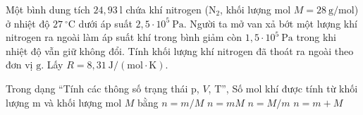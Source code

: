 \begin{ex}
Một bình dung tích $24,93\ \mathrm{l}$ chứa khí nitrogen ($\mathrm{N_2}$, khối lượng mol $M = 28\ \mathrm{g/mol}$) ở nhiệt độ $27\ ^\circ\mathrm{C}$ dưới áp suất $2,5 \cdot 10^5\ \mathrm{Pa}$. Người ta mở van xả bớt một lượng khí nitrogen ra ngoài làm áp suất khí trong bình giảm còn $1,5 \cdot 10^5\ \mathrm{Pa}$ trong khi nhiệt độ vẫn giữ không đổi. Tính khối lượng khí nitrogen đã thoát ra ngoài theo đơn vị $\mathrm{g}$. Lấy $R = 8,31\ \mathrm{J/(mol\cdot K)}$.
\end{ex}

\begin{ex}
Trong dạng “Tính các thông số trạng thái p, $V$, T”, Số mol khí được tính từ khối lượng m và khối lượng mol $M$ bằng
\choice
{\True $n=m/M$}
{$n=mM$}
{$n=M/m$}
{$n=m+M$}
\end{ex}

